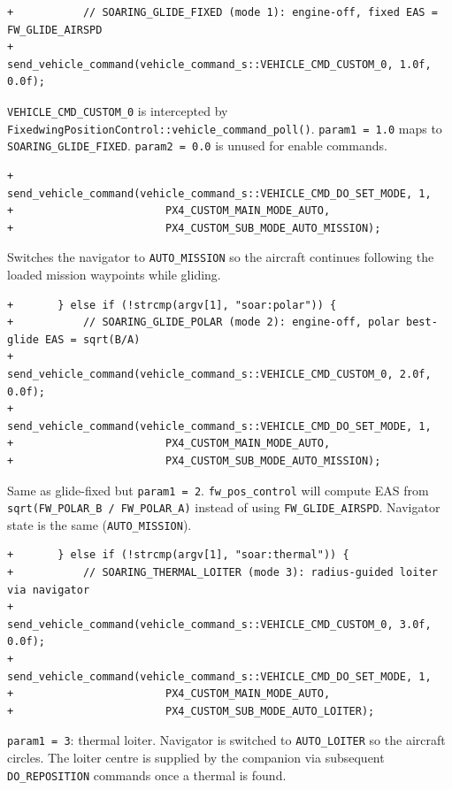 \documentclass[12pt,a4paper]{article}
\begin{document}
\begin{lstlisting}[style=diff]
+			// SOARING_GLIDE_FIXED (mode 1): engine-off, fixed EAS = FW_GLIDE_AIRSPD
+			send_vehicle_command(vehicle_command_s::VEHICLE_CMD_CUSTOM_0, 1.0f, 0.0f);
\end{lstlisting}
\begin{annotation}\texttt{VEHICLE\_CMD\_CUSTOM\_0} is intercepted by \texttt{FixedwingPositionControl::vehicle\_command\_poll()}. \texttt{param1 = 1.0} maps to \texttt{SOARING\_GLIDE\_FIXED}. \texttt{param2 = 0.0} is unused for enable commands.\end{annotation}

\begin{lstlisting}[style=diff]
+			send_vehicle_command(vehicle_command_s::VEHICLE_CMD_DO_SET_MODE, 1,
+					     PX4_CUSTOM_MAIN_MODE_AUTO,
+					     PX4_CUSTOM_SUB_MODE_AUTO_MISSION);
\end{lstlisting}
\begin{annotation}Switches the navigator to \texttt{AUTO\_MISSION} so the aircraft continues following the loaded mission waypoints while gliding.\end{annotation}

\begin{lstlisting}[style=diff]
+		} else if (!strcmp(argv[1], "soar:polar")) {
+			// SOARING_GLIDE_POLAR (mode 2): engine-off, polar best-glide EAS = sqrt(B/A)
+			send_vehicle_command(vehicle_command_s::VEHICLE_CMD_CUSTOM_0, 2.0f, 0.0f);
+			send_vehicle_command(vehicle_command_s::VEHICLE_CMD_DO_SET_MODE, 1,
+					     PX4_CUSTOM_MAIN_MODE_AUTO,
+					     PX4_CUSTOM_SUB_MODE_AUTO_MISSION);
\end{lstlisting}
\begin{annotation}Same as glide-fixed but \texttt{param1 = 2}. \texttt{fw\_pos\_control} will compute EAS from \texttt{sqrt(FW\_POLAR\_B / FW\_POLAR\_A)} instead of using \texttt{FW\_GLIDE\_AIRSPD}. Navigator state is the same (\texttt{AUTO\_MISSION}).\end{annotation}

\begin{lstlisting}[style=diff]
+		} else if (!strcmp(argv[1], "soar:thermal")) {
+			// SOARING_THERMAL_LOITER (mode 3): radius-guided loiter via navigator
+			send_vehicle_command(vehicle_command_s::VEHICLE_CMD_CUSTOM_0, 3.0f, 0.0f);
+			send_vehicle_command(vehicle_command_s::VEHICLE_CMD_DO_SET_MODE, 1,
+					     PX4_CUSTOM_MAIN_MODE_AUTO,
+					     PX4_CUSTOM_SUB_MODE_AUTO_LOITER);
\end{lstlisting}
\begin{annotation}\texttt{param1 = 3}: thermal loiter. Navigator is switched to \texttt{AUTO\_LOITER} so the aircraft circles. The loiter centre is supplied by the companion via subsequent \texttt{DO\_REPOSITION} commands once a thermal is found.\end{annotation}
\end{document}
